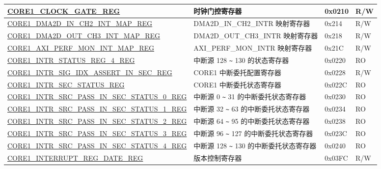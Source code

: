 \begin{longtable}{ | p{8.7cm} | p{6.2cm} | p{1.3cm} | p{1cm} | }
\hyperref[regdesc:CORE1CLOCKGATEREG]{CORE1\_CLOCK\_GATE\_REG} & 时钟门控寄存器 & 0x0210 & R/W \\ \hline


\hyperref[regdesc:CORE1DMA2DINCH2INTMAPREG]{CORE1\_DMA2D\_IN\_CH2\_INT\_MAP\_REG} & DMA2D\_IN\_CH2\_INTR 映射寄存器 & 0x214 & R/W \\ \hline

\hyperref[regdesc:CORE1DMA2DOUTCH3INTMAPREG]{CORE1\_DMA2D\_OUT\_CH3\_INT\_MAP\_REG} & DMA2D\_OUT\_CH3\_INTR 映射寄存器 & 0x218 & R/W \\ \hline

\hyperref[regdesc:CORE1AXIPERFMONINTMAPREG]{CORE1\_AXI\_PERF\_MON\_INT\_MAP\_REG} & AXI\_PERF\_MON\_INTR 映射寄存器 & 0x21C & R/W \\ \hline

\hyperref[regdesc:CORE1INTRSTATUSREG4REG]{CORE1\_INTR\_STATUS\_REG\_4\_REG} & 中断源 128 \verb+~+ 130 的状态寄存器 & 0x0220 & RO \\ \hline

\hyperref[regdesc:CORE1INTRSIGIDXASSERTINSECREG]{CORE1\_INTR\_SIG\_IDX\_ASSERT\_IN\_SEC\_REG} & CORE1 中断委托配置寄存器 & 0x0228 & R/W \\ \hline

\hyperref[regdesc:CORE1INTRSECSTATUSREG]{CORE1\_INTR\_SEC\_STATUS\_REG} & CORE1 中断委托状态寄存器 & 0x022C & RO \\ \hline

\hyperref[regdesc:CORE1INTRSRCPASSINSECSTATUS0REG]{CORE1\_INTR\_SRC\_PASS\_IN\_SEC\_STATUS\_0\_REG} & 中断源 0 \verb+~+ 31 的中断委托状态寄存器 & 0x0230 & RO \\ \hline

\hyperref[regdesc:CORE1INTRSRCPASSINSECSTATUS1REG]{CORE1\_INTR\_SRC\_PASS\_IN\_SEC\_STATUS\_1\_REG} & 中断源 32 \verb+~+ 63 的中断委托状态寄存器 & 0x0234 & RO \\ \hline

\hyperref[regdesc:CORE1INTRSRCPASSINSECSTATUS2REG]{CORE1\_INTR\_SRC\_PASS\_IN\_SEC\_STATUS\_2\_REG} & 中断源 64 \verb+~+ 95 的中断委托状态寄存器 & 0x0238 & RO \\ \hline

\hyperref[regdesc:CORE1INTRSRCPASSINSECSTATUS3REG]{CORE1\_INTR\_SRC\_PASS\_IN\_SEC\_STATUS\_3\_REG} & 中断源 96 \verb+~+ 127 的中断委托状态寄存器 & 0x023C & RO \\ \hline

\hyperref[regdesc:CORE1INTRSRCPASSINSECSTATUS4REG]{CORE1\_INTR\_SRC\_PASS\_IN\_SEC\_STATUS\_4\_REG} & 中断源 128 \verb+~+ 130 的中断委托状态寄存器 & 0x0240 & RO \\ \hline


\hyperref[regdesc:CORE1INTERRUPTREGDATEREG]{CORE1\_INTERRUPT\_REG\_DATE\_REG} & 版本控制寄存器 & 0x03FC & R/W \\ \hline
\end{longtable}
